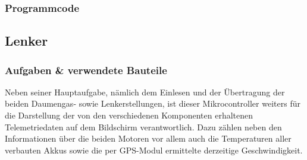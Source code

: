 \newpage
\subsubsection{Programmcode}

\newpage
\subsection{Lenker\label{sec:Lenkerplatine}}
\subsubsection{Aufgaben \& verwendete Bauteile}
Neben seiner Hauptaufgabe, nämlich dem Einlesen und der Übertragung der beiden Daumengas- sowie Lenkerstellungen, ist dieser Mikrocontroller weiters für die Darstellung der von den verschiedenen Komponenten erhaltenen Telemetriedaten auf dem Bildschirm verantwortlich.
Dazu zählen neben den Informationen über die beiden Motoren vor allem auch die Temperaturen aller verbauten Akkus sowie die per GPS-Modul ermittelte derzeitige Geschwindigkeit.

